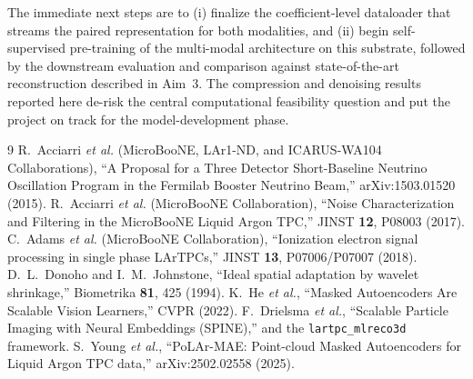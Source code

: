 \documentclass[11pt]{article}
\begin{document}
The immediate next steps are to (i) finalize the coefficient-level dataloader that streams
the paired representation for both modalities, and (ii) begin self-supervised pre-training of
the multi-modal architecture on this substrate, followed by the downstream evaluation and
comparison against state-of-the-art reconstruction described in Aim~3. The compression and
denoising results reported here de-risk the central computational feasibility question and
put the project on track for the model-development phase.

\begin{thebibliography}{9}
 R.~Acciarri \emph{et al.} (MicroBooNE, LAr1-ND, and ICARUS-WA104
Collaborations), ``A Proposal for a Three Detector Short-Baseline Neutrino Oscillation
Program in the Fermilab Booster Neutrino Beam,'' arXiv:1503.01520 (2015).
 R.~Acciarri \emph{et al.} (MicroBooNE Collaboration), ``Noise
Characterization and Filtering in the MicroBooNE Liquid Argon TPC,'' JINST \textbf{12},
P08003 (2017).
 C.~Adams \emph{et al.} (MicroBooNE Collaboration), ``Ionization electron
signal processing in single phase LArTPCs,'' JINST \textbf{13}, P07006/P07007 (2018).
 D.~L.~Donoho and I.~M.~Johnstone, ``Ideal spatial adaptation by wavelet
shrinkage,'' Biometrika \textbf{81}, 425 (1994).
 K.~He \emph{et al.}, ``Masked Autoencoders Are Scalable Vision Learners,''
CVPR (2022).
 F.~Drielsma \emph{et al.}, ``Scalable Particle Imaging with Neural
Embeddings (SPINE),'' and the \texttt{lartpc\_mlreco3d} framework.
 S.~Young \emph{et al.}, ``PoLAr-MAE: Point-cloud Masked Autoencoders for
Liquid Argon TPC data,'' arXiv:2502.02558 (2025).
\end{thebibliography}
\end{document}
